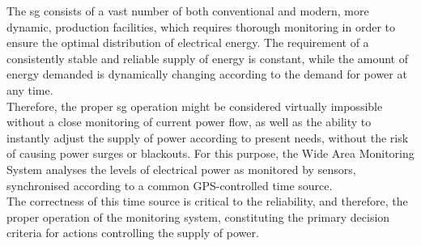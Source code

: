 The \acrshort{sg} consists of a vast number of both conventional and modern, more dynamic, production facilities, which requires thorough monitoring in order to ensure the optimal distribution of electrical energy. The requirement of a consistently stable and reliable supply of energy is constant, while the amount of energy demanded is dynamically changing according to the demand for power at any time. \\ 

Therefore, the proper \acrshort{sg} operation might be considered virtually impossible without a  close monitoring of current power flow, as well as the ability to instantly adjust the supply of power according to present needs,  without the risk of causing power surges or blackouts. For this purpose, the Wide Area Monitoring System analyses the levels of electrical power as monitored by sensors, synchronised according to a common GPS-controlled time source. \\ 

The correctness of this time source is critical to the reliability, and therefore, the proper operation of the monitoring system, constituting the primary decision criteria for actions controlling the supply of power.


